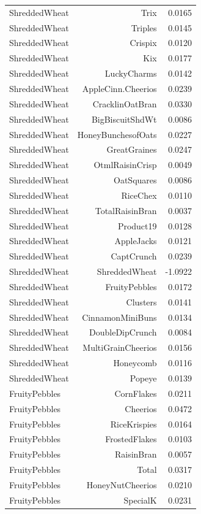 \begin{longtable}{@{}lrr@{}}
ShreddedWheat & Trix & 0.0165 \\
ShreddedWheat & Triples & 0.0145 \\
ShreddedWheat & Crispix & 0.0120 \\
ShreddedWheat & Kix & 0.0177 \\
ShreddedWheat & LuckyCharms & 0.0142 \\
ShreddedWheat & AppleCinn.Cheerios & 0.0239 \\
ShreddedWheat & CracklinOatBran & 0.0330 \\
ShreddedWheat & BigBiscuitShdWt & 0.0086 \\
ShreddedWheat & HoneyBunchesofOats & 0.0227 \\
ShreddedWheat & GreatGraines & 0.0247 \\
ShreddedWheat & OtmlRaisinCrisp & 0.0049 \\
ShreddedWheat & OatSquares & 0.0086 \\
ShreddedWheat & RiceChex & 0.0110 \\
ShreddedWheat & TotalRaisinBran & 0.0037 \\
ShreddedWheat & Product19 & 0.0128 \\
ShreddedWheat & AppleJacks & 0.0121 \\
ShreddedWheat & CaptCrunch & 0.0239 \\
ShreddedWheat & ShreddedWheat & -1.0922 \\
ShreddedWheat & FruityPebbles & 0.0172 \\
ShreddedWheat & Clusters & 0.0141 \\
ShreddedWheat & CinnamonMiniBuns & 0.0134 \\
ShreddedWheat & DoubleDipCrunch & 0.0084 \\
ShreddedWheat & MultiGrainCheerios & 0.0156 \\
ShreddedWheat & Honeycomb & 0.0116 \\
ShreddedWheat & Popeye & 0.0139 \\
FruityPebbles & CornFlakes & 0.0211 \\
FruityPebbles & Cheerios & 0.0472 \\
FruityPebbles & RiceKrispies & 0.0164 \\
FruityPebbles & FrostedFlakes & 0.0103 \\
FruityPebbles & RaisinBran & 0.0057 \\
FruityPebbles & Total & 0.0317 \\
FruityPebbles & HoneyNutCheerios & 0.0210 \\
FruityPebbles & SpecialK & 0.0231 \\

\end{longtable}

